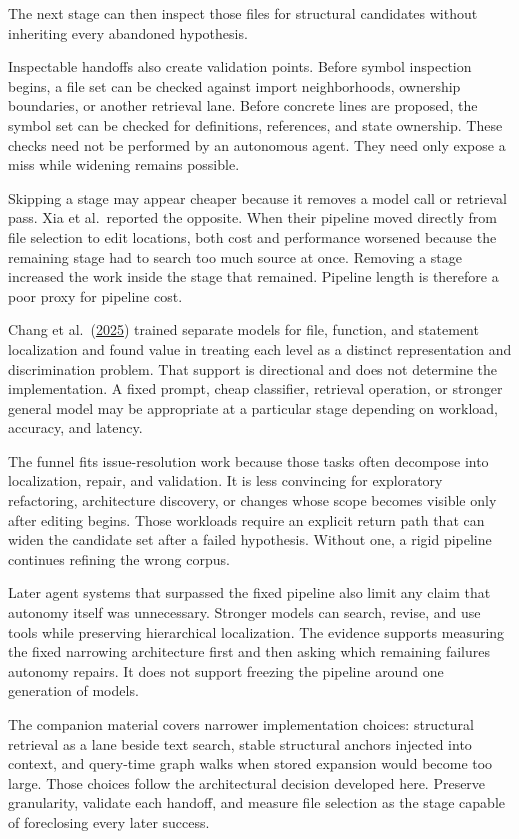 The next stage can then inspect those files for structural candidates without inheriting every abandoned hypothesis.

Inspectable handoffs also create validation points. Before symbol inspection begins, a file set can be checked against import neighborhoods, ownership boundaries, or another retrieval lane. Before concrete lines are proposed, the symbol set can be checked for definitions, references, and state ownership. These checks need not be performed by an autonomous agent. They need only expose a miss while widening remains possible.

Skipping a stage may appear cheaper because it removes a model call or retrieval pass. Xia et al.~reported the opposite. When their pipeline moved directly from file selection to edit locations, both cost and performance worsened because the remaining stage had to search too much source at once. Removing a stage increased the work inside the stage that remained. Pipeline length is therefore a poor proxy for pipeline cost.

Chang et al.~(\href{https://arxiv.org/abs/2502.15292}{2025}) trained separate models for file, function, and statement localization and found value in treating each level as a distinct representation and discrimination problem. That support is directional and does not determine the implementation. A fixed prompt, cheap classifier, retrieval operation, or stronger general model may be appropriate at a particular stage depending on workload, accuracy, and latency.

The funnel fits issue-resolution work because those tasks often decompose into localization, repair, and validation. It is less convincing for exploratory refactoring, architecture discovery, or changes whose scope becomes visible only after editing begins. Those workloads require an explicit return path that can widen the candidate set after a failed hypothesis. Without one, a rigid pipeline continues refining the wrong corpus.

Later agent systems that surpassed the fixed pipeline also limit any claim that autonomy itself was unnecessary. Stronger models can search, revise, and use tools while preserving hierarchical localization. The evidence supports measuring the fixed narrowing architecture first and then asking which remaining failures autonomy repairs. It does not support freezing the pipeline around one generation of models.

The companion material covers narrower implementation choices: structural retrieval as a lane beside text search, stable structural anchors injected into context, and query-time graph walks when stored expansion would become too large. Those choices follow the architectural decision developed here. Preserve granularity, validate each handoff, and measure file selection as the stage capable of foreclosing every later success.

